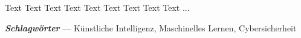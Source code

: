 \thispagestyle{plain} %
\chapter*{\abstractname}
Text Text Text Text Text Text Text Text Text ...

\textbf{\textit{Schlagwörter}} --- Künstliche Intelligenz, Maschinelles Lernen, Cybersicherheit



